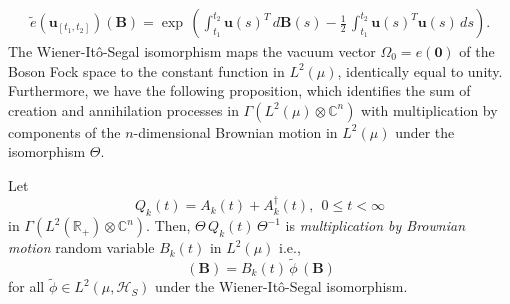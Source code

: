 \begin{eqnarray} 
\widetilde{e}(\mathbf{u}_{[t_1,t_2]})(\mathbf{B})={\exp}\,\left( \int_{t_1}^{t_{2}} \mathbf{u}(s)^T\, d\mathbf{B}(s)-  \frac{1}{2}\,\int_{t_1}^{t_{2}} \mathbf{u}(s)^T\mathbf{u}(s)\, ds\right).   \label{chap5-eq5.5}
\end{eqnarray}   
The Wiener-It\^{o}-Segal isomorphism maps the vacuum vector $\Omega_0=e(\mathbf{0})$ of the Boson Fock space  
to the constant function in $L^2(\mu)$, identically equal to unity.  Furthermore, we have the following proposition, 
which identifies the sum of creation and annihilation processes in $\Gamma(L^2(\mu)\otimes \mathbb{C}^n)$  with multiplication by components of the $n$-dimensional Brownian motion    
in $L^{2}(\mu)$ under the isomorphism $\Theta$.

\begin{prop*}
Let 
$$
Q_k(t)=A_k(t)+A^\dag_k(t),\ \  0\leq t<\infty
$$ 
in  $\Gamma(L^2(\mathbb{R}_+)\otimes \mathbb{C}^n)$. Then, $\Theta\, Q_k(t)\, \Theta^{-1}$ is {\em multiplication by Brownian motion} random variable $B_k(t)$ in  $L^{2}(\mu)$ i.e.,  
\begin{equation}
[\, \widetilde{Q}_k(t)\,\, \widetilde{\phi}\,]\, (\mathbf{B})= B_k(t)\, \widetilde{\phi}\,(\mathbf{B}) \label{chap5-eq5.6}
\end{equation}
for all $\widetilde{\phi}\in L^2(\mu, \mathcal{H}_S)$ under the Wiener-It{\^o}-Segal isomorphism.  
\end{prop*}

